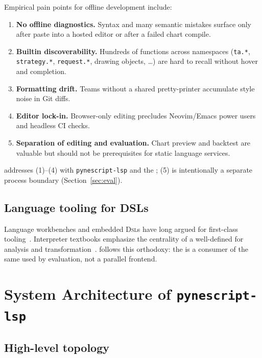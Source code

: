 \documentclass[11pt,a4paper]{article}
\begin{document}
Empirical pain points for offline \pine{} development include:
\begin{enumerate}[leftmargin=*]
  \item \textbf{No offline diagnostics.} Syntax and many semantic mistakes surface only
        after paste into a hosted editor or after a failed chart compile.
  \item \textbf{Builtin discoverability.} Hundreds of functions across namespaces
        (\texttt{ta.*}, \texttt{strategy.*}, \texttt{request.*}, drawing objects, \ldots)
        are hard to recall without hover and completion.
  \item \textbf{Formatting drift.} Teams without a shared pretty-printer accumulate
        style noise in Git diffs.
  \item \textbf{Editor lock-in.} Browser-only editing precludes Neovim/Emacs power users
        and headless CI checks.
  \item \textbf{Separation of editing and evaluation.} Chart preview and backtest are
        valuable but should not be prerequisites for static language services.
\end{enumerate}
\pyne{} addresses (1)--(4) with \texttt{pynescript-lsp} and the \cli{}; (5) is
intentionally a separate process boundary (Section~\ref{sec:eval}).

\subsection{Language tooling for DSLs}
\label{sec:bg-dsl}

Language workbenches and embedded \textsc{Dsl}s have long argued for first-class
tooling~\citep{fowler2010dsl,hudak1996dsl}. Interpreter textbooks emphasize the
centrality of a well-defined \ast{} for analysis and transformation~\citep{nystrom2021crafting}.
\pyne{} follows this orthodoxy: the \lsp{} is a consumer of the same \ast{} used by
evaluation, not a parallel frontend.

\section{System Architecture of \texttt{pynescript-lsp}}
\label{sec:architecture}

\subsection{High-level topology}
\label{sec:arch-topo}
\end{document}
